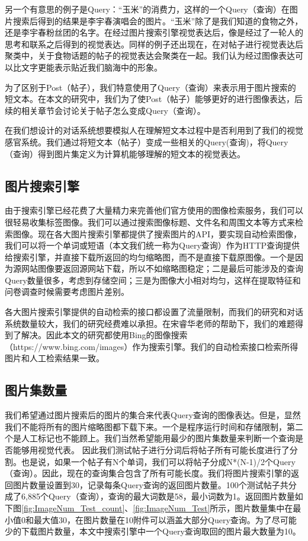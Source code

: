 另一个有意思的例子是Query：“玉米”的消费力，这样的一个Query（查询）在图片搜索后得到的结果是李宇春演唱会的图片。“玉米”除了是我们知道的食物之外，还是李宇春粉丝团的名字。在经过图片搜索引擎视觉表达后，像是经过了一轮人的思考和联系之后得到的视觉表达。同样的例子还出现在，在对帖子进行视觉表达后聚类中，关于食物话题的帖子的视觉表达会聚类在一起。我们认为经过图像表达可以比文字更能表示贴近我们脑海中的形象。

为了区别于Post（帖子），我们特意使用了Query（查询）来表示用于图片搜索的短文本。在本文的研究中，我们为了使Post（帖子）能够更好的进行图像表达，后续的相关章节会讨论关于帖子怎么变成Query（查询）。

在我们想设计的对话系统想要模拟人在理解短文本过程中是否利用到了我们的视觉感官系统。我们通过将短文本（帖子）变成一些相关的Query(查询)，将Query（查询）得到图片集定义为计算机能够理解的短文本的视觉表达。

\subsection{图片搜索引擎}
由于搜索引擎已经花费了大量精力来完善他们官方使用的图像检索服务，我们可以很轻易收集标签图像。我们可以通过搜索图像标题、文件名和周围文本等方式来检索图像。现在各大图片搜索引擎都提供了搜索图片的API，要实现自动检索图像，我们可以将一个单词或短语（本文我们统一称为Query查询）作为HTTP查询提供给搜索引擎，并直接下载所返回的均匀缩略图，而不是直接下载原图像。一个是因为源网站图像要返回源网站下载，所以不如缩略图稳定；二是最后可能涉及的查询Query数量很多，考虑到存储空间；三是为图像大小相对均匀，这样在提取特征和问卷调查时候需要考虑图片差别。

各大图片搜索引擎提供的自动检索的接口都设置了流量限制，而我们的研究和对话系统数量较大，我们的研究经费难以承担。在宋睿华老师的帮助下，我们的难题得到了解决。因此本文的研究都使用Bing的图像搜索（https://www.bing.com/images）作为搜索引擎。我们的自动检索接口检索所得图片和人工检索结果一致。

\subsection{图片集数量}
我们希望通过图片搜索后的图片的集合来代表Query查询的图像表达。但是，显然我们不能将所有的图片缩略图都下载下来。一个是程序运行时间和存储限制，第二个是人工标记也不能顾上。我们当然希望能用最少的图片集数量来判断一个查询是否能够用视觉代表。
因此我们测试帖子进行分词后将帖子所有可能长度进行了分割。也是说，如果一个帖子有N个单词，我们可以将帖子分成N*(N-1)/2个Query（查询）。因此，现在的查询集合包含了所有可能长度。我们将图片搜索引擎的返回图片数量设置到30，记录每条Query查询的返回图片数量。100个测试帖子共分成了6,885个Query（查询），查询的最大词数是58，最小词数为1。返回图片数量如下图\ref{fig:ImageNum_Test_count}、\ref{fig:ImageNum_Test}所示，图片数量集中在最小值0和最大值30，在图片数量在10附件可以涵盖大部分Query查询。为了尽可能少的下载图片数量，本文中搜索引擎中一个Query查询取回的图片最大数量为10。





